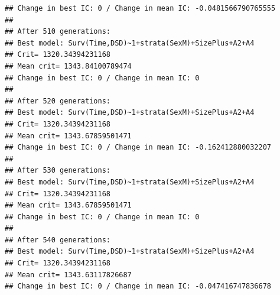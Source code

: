\documentclass{article}\usepackage[]{graphicx}\usepackage[]{color}
\makeatletter
\newenvironment{kframe}{%
 \def\at@end@of@kframe{}%
 \ifinner\ifhmode%
  \def\at@end@of@kframe{\end{minipage}}%
  \begin{minipage}{\columnwidth}%
 \fi\fi%
 \def\FrameCommand##1{\hskip\@totalleftmargin \hskip-\fboxsep
 \colorbox{shadecolor}{##1}\hskip-\fboxsep
     \hskip-\linewidth \hskip-\@totalleftmargin \hskip\columnwidth}%
 \MakeFramed {\advance\hsize-\width
   \@totalleftmargin\z@ \linewidth\hsize
   \@setminipage}}%
 {\par\unskip\endMakeFramed%
 \at@end@of@kframe}
\newenvironment{knitrout}{}{} %
\makeatother
\begin{document}
\begin{knitrout}
\begin{kframe}
\begin{verbatim}
## Change in best IC: 0 / Change in mean IC: -0.0481566790765555
## 
## After 510 generations:
## Best model: Surv(Time,DSD)~1+strata(SexM)+SizePlus+A2+A4
## Crit= 1320.34394231168
## Mean crit= 1343.84100789474
## Change in best IC: 0 / Change in mean IC: 0
## 
## After 520 generations:
## Best model: Surv(Time,DSD)~1+strata(SexM)+SizePlus+A2+A4
## Crit= 1320.34394231168
## Mean crit= 1343.67859501471
## Change in best IC: 0 / Change in mean IC: -0.162412880032207
## 
## After 530 generations:
## Best model: Surv(Time,DSD)~1+strata(SexM)+SizePlus+A2+A4
## Crit= 1320.34394231168
## Mean crit= 1343.67859501471
## Change in best IC: 0 / Change in mean IC: 0
## 
## After 540 generations:
## Best model: Surv(Time,DSD)~1+strata(SexM)+SizePlus+A2+A4
## Crit= 1320.34394231168
## Mean crit= 1343.63117826687
## Change in best IC: 0 / Change in mean IC: -0.047416747836678
\end{verbatim}



\end{kframe}
\end{knitrout}
\end{document}
